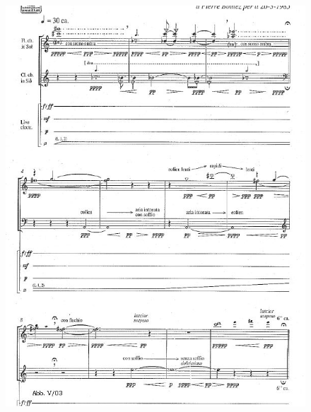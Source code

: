 \begin{figure}[htbp]
\begin{center}
\includegraphics[width=1\textwidth]{images/nono/hph/ab_v_03.jpg}
\caption{}
\label{hph-img3}
\end{center}
\end{figure}


